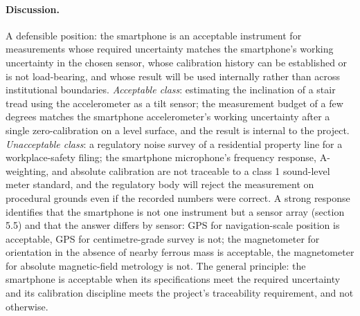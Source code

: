 \paragraph{Discussion.} A defensible position: the smartphone is
an acceptable instrument for measurements whose required
uncertainty matches the smartphone's working uncertainty in the
chosen sensor, whose calibration history can be established or is
not load-bearing, and whose result will be used internally rather
than across institutional boundaries. \emph{Acceptable class}:
estimating the inclination of a stair tread using the accelerometer
as a tilt sensor; the measurement budget of a few degrees matches
the smartphone accelerometer's working uncertainty after a single
zero-calibration on a level surface, and the result is internal to
the project. \emph{Unacceptable class}: a regulatory noise survey
of a residential property line for a workplace-safety filing; the
smartphone microphone's frequency response, A-weighting, and
absolute calibration are not traceable to a class 1 sound-level
meter standard, and the regulatory body will reject the
measurement on procedural grounds even if the recorded numbers
were correct. A strong response identifies that the smartphone is
not one instrument but a sensor array (section 5.5) and that the
answer differs by sensor: GPS for navigation-scale position is
acceptable, GPS for centimetre-grade survey is not; the
magnetometer for orientation in the absence of nearby ferrous
mass is acceptable, the magnetometer for absolute magnetic-field
metrology is not. The general principle: the smartphone is
acceptable when its specifications meet the required uncertainty
and its calibration discipline meets the project's traceability
requirement, and not otherwise.
